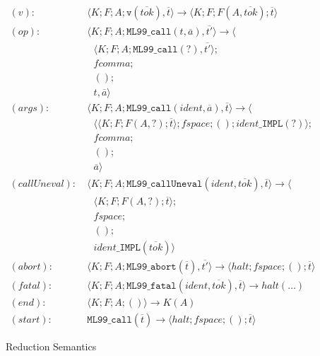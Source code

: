 \documentclass[12pt]{article}
\theoremstyle{break}
\begin{document}
\begin{figure}
    \caption{Reduction Semantics}

    \begin{align*}
        (v): & \ \langle K; F; A; \texttt{v}(\overline{tok}), \overline{t} \rangle \to
            \langle K; F; F(A, \overline{tok}); \overline{t} \rangle \\
        (op): & \ \langle K; F; A; \texttt{ML99\_call}(t, \overline{a}), \overline{t'} \rangle \to \langle \\
            & \ \ \ \ \langle K; F; A; \texttt{ML99\_call}(?), \overline{t'} \rangle; \\
            & \ \ \ \ fcomma; \\
            & \ \ \ \ (); \\
            & \ \ \ \ t, \overline{a} \rangle \\
        (args): & \ \langle K; F; A; \texttt{ML99\_call}(ident, \overline{a}), \overline{t} \rangle \to \langle \\
            & \ \ \ \ \langle \langle K; F; F(A, ?); \overline{t} \rangle; fspace; (); ident\texttt{\_IMPL}(?) \rangle; \\
            & \ \ \ \ fcomma; \\
            & \ \ \ \ (); \\
            & \ \ \ \ \overline{a} \rangle \\
        (callUneval): & \ \langle K; F; A; \texttt{ML99\_callUneval}(ident, \overline{tok}), \overline{t} \rangle \to \langle \\
            & \ \ \ \ \langle K; F; F(A, ?); \overline{t} \rangle; \\
            & \ \ \ \ fspace; \\
            & \ \ \ \ (); \\
            & \ \ \ \ ident\texttt{\_IMPL}(\overline{tok}) \rangle \\
        (abort): & \ \langle K; F; A; \texttt{ML99\_abort}(\overline{t}), \overline{t'} \rangle \to \langle halt; fspace; (); \overline{t} \rangle \\
        (fatal): & \ \langle K; F; A; \texttt{ML99\_fatal}(ident, \overline{tok}), \overline{t} \rangle \to halt(\ldots) \\
        (end): & \ \langle K; F; A; () \rangle \to K(A) \\
        (start): & \ \texttt{ML99\_call}(\overline{t}) \to \langle halt; fspace; (); \overline{t} \rangle
    \end{align*}
    \label{ReductionSemantics}
\end{figure}
\end{document}
